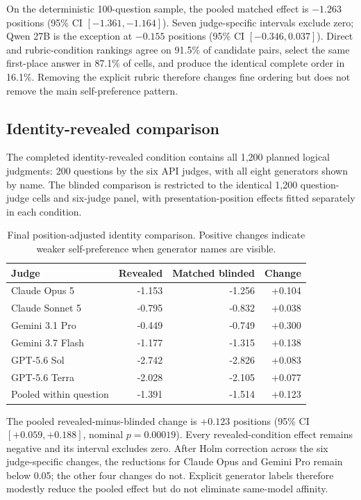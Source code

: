 \documentclass[11pt]{article}
\begin{document}
On the deterministic 100-question sample, the pooled matched effect is
$-1.263$ positions (95\% CI $[-1.361,-1.164]$). Seven judge-specific intervals
exclude zero; Qwen 27B is the exception at $-0.155$ positions (95\% CI
$[-0.346,0.037]$). Direct and rubric-condition rankings agree on 91.5\% of
candidate pairs, select the same first-place answer in 87.1\% of cells, and
produce the identical complete order in 16.1\%. Removing the explicit rubric
therefore changes fine ordering but does not remove the main self-preference
pattern.

\subsection{Identity-revealed comparison}

The completed identity-revealed condition contains all 1,200 planned logical
judgments: 200 questions by the six API judges, with all eight generators shown
by name. The blinded comparison is restricted to the identical 1,200
question-judge cells and six-judge panel, with presentation-position effects
fitted separately in each condition.

\begin{table}[htbp]
\centering
\small
\caption{Final position-adjusted identity comparison. Positive changes indicate
weaker self-preference when generator names are visible.}
\label{tab:identity}
\begin{tabular}{lrrr}
\toprule
Judge & Revealed & Matched blinded & Change \\
\midrule
Claude Opus 5 & -1.153 & -1.256 & +0.104 \\
Claude Sonnet 5 & -0.795 & -0.832 & +0.038 \\
Gemini 3.1 Pro & -0.449 & -0.749 & +0.300 \\
Gemini 3.7 Flash & -1.177 & -1.315 & +0.138 \\
GPT-5.6 Sol & -2.742 & -2.826 & +0.083 \\
GPT-5.6 Terra & -2.028 & -2.105 & +0.077 \\
\midrule
Pooled within question & -1.391 & -1.514 & +0.123 \\
\bottomrule
\end{tabular}
\end{table}
\FloatBarrier

The pooled revealed-minus-blinded change is $+0.123$ positions (95\% CI
$[+0.059,+0.188]$, nominal $p=0.00019$). Every revealed-condition effect
remains negative and its interval excludes zero. After Holm correction across
the six judge-specific changes, the reductions for Claude Opus and Gemini Pro
remain below 0.05; the other four changes do not. Explicit generator labels
therefore modestly reduce the pooled effect but do not eliminate same-model
affinity.
\end{document}
